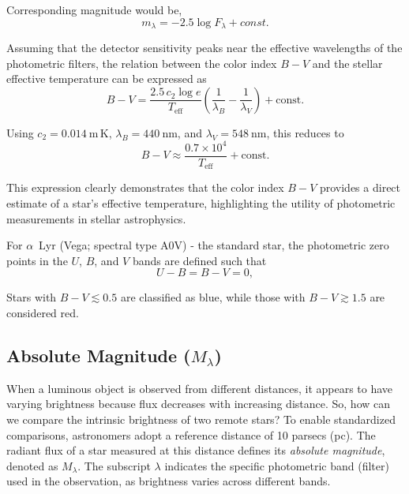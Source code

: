 Corresponding magnitude would be,
\begin{equation}
m_\lambda = -2.5 \log F_\lambda + const.
\end{equation}

Assuming that the detector sensitivity peaks near the effective wavelengths of the photometric filters, the relation between the color index \(B-V\) and the stellar effective temperature can be expressed as
\begin{equation}
B - V = \frac{2.5\, c_2 \log e}{T_{\mathrm{eff}}}
\left(\frac{1}{\lambda_B} - \frac{1}{\lambda_V} \right) + \mathrm{const.}
\end{equation}

Using \(c_2 = 0.014~\mathrm{m\,K}\), \(\lambda_B = 440~\mathrm{nm}\), and \(\lambda_V = 548~\mathrm{nm}\), this reduces to
\begin{equation}
B - V \approx \frac{0.7 \times 10^{4}}{T_{\mathrm{eff}}} + \mathrm{const.}
\end{equation}

This expression clearly demonstrates that the color index \(B-V\) provides a direct estimate of a star's effective temperature, highlighting the utility of photometric measurements in stellar astrophysics.

For \(\alpha\)~Lyr (Vega; spectral type A0V) - the standard star, the photometric zero points in the \(U\), \(B\), and \(V\) bands are defined such that
\begin{equation}
U - B = B - V = 0,
\end{equation}

Stars with $B-V \lesssim 0.5$ are classified as blue, while those with $B-V \gtrsim 1.5$ are considered red.


\subsection{Absolute Magnitude ($M_\lambda$)}
When a luminous object is observed from different distances, it appears to have varying brightness because flux decreases with increasing distance. So, how can we compare the intrinsic brightness of two remote stars?  To enable standardized comparisons, astronomers adopt a reference distance of 10 parsecs (pc). The radiant flux of a star measured at this distance defines its \textit{absolute magnitude}, denoted as $M_\lambda$. The subscript $\lambda$ indicates the specific photometric band (filter) used in the observation, as brightness varies across different bands.

